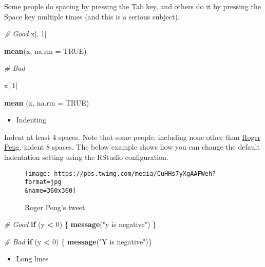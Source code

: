 \documentclass[
]{book}
\newenvironment{Shaded}{\begin{snugshade}}{\end{snugshade}}
\newcommand{\CommentTok}[1]{\textcolor[rgb]{0.56,0.35,0.01}{\textit{#1}}}
\newcommand{\ControlFlowTok}[1]{\textcolor[rgb]{0.13,0.29,0.53}{\textbf{#1}}}
\newcommand{\DataTypeTok}[1]{\textcolor[rgb]{0.13,0.29,0.53}{#1}}
\newcommand{\DecValTok}[1]{\textcolor[rgb]{0.00,0.00,0.81}{#1}}
\newcommand{\KeywordTok}[1]{\textcolor[rgb]{0.13,0.29,0.53}{\textbf{#1}}}
\newcommand{\NormalTok}[1]{#1}
\newcommand{\OperatorTok}[1]{\textcolor[rgb]{0.81,0.36,0.00}{\textbf{#1}}}
\newcommand{\OtherTok}[1]{\textcolor[rgb]{0.56,0.35,0.01}{#1}}
\newcommand{\StringTok}[1]{\textcolor[rgb]{0.31,0.60,0.02}{#1}}
\providecommand{\tightlist}{%
  \setlength{\itemsep}{0pt}\setlength{\parskip}{0pt}}
\begin{document}
Some people do spacing by pressing the Tab key, and others do it by pressing the Space key multiple times (and this is a serious subject).

\begin{Shaded}
\begin{Highlighting}[]
\CommentTok{\# Good}
\NormalTok{x[, }\DecValTok{1}\NormalTok{] }

\KeywordTok{mean}\NormalTok{(x, }\DataTypeTok{na.rm =} \OtherTok{TRUE}\NormalTok{) }

\CommentTok{\# Bad}

\NormalTok{x[,}\DecValTok{1}\NormalTok{]}

\KeywordTok{mean}\NormalTok{ (x, }\DataTypeTok{na.rm =} \OtherTok{TRUE}\NormalTok{)}
\end{Highlighting}
\end{Shaded}

\begin{itemize}
\tightlist
\item
  Indenting
\end{itemize}

Indent at least 4 spaces. Note that some people, including none other than \href{https://simplystatistics.org/2018/07/27/why-i-indent-my-code-8-spaces/}{Roger Peng}, indent 8 spaces. The below example shows how you can change the default indentation setting using the RStudio configuration.

\begin{figure}
\centering
\texttt{[image: https://pbs.twimg.com/media/CuHHs7yXgAAFWeh?format=jpg\\\&name=360x360]}
\caption{Roger Peng's tweet}
\end{figure}

\begin{Shaded}
\begin{Highlighting}[]
\CommentTok{\# Good}
\ControlFlowTok{if}\NormalTok{ (y }\OperatorTok{\textless{}}\StringTok{ }\DecValTok{0}\NormalTok{) \{}
  \KeywordTok{message}\NormalTok{(}\StringTok{"y is negative"}\NormalTok{)}
\NormalTok{\}}

\CommentTok{\# Bad}
\ControlFlowTok{if}\NormalTok{ (y }\OperatorTok{\textless{}}\StringTok{ }\DecValTok{0}\NormalTok{) \{}
\KeywordTok{message}\NormalTok{(}\StringTok{"Y is negative"}\NormalTok{)\}}
\end{Highlighting}
\end{Shaded}

\begin{itemize}
\tightlist
\item
  Long lines
\end{itemize}
\end{document}

